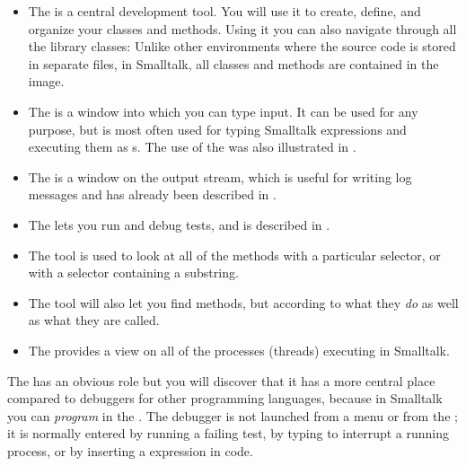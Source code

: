\documentclass[a4paper,10pt,twoside]{book}
\begin{document}
\begin{itemize}
	\item {The } is a central development tool.
		You will use it to create, define, and organize your classes and methods.
		Using it you can also navigate through all the library classes:
		Unlike other environments where the source code is stored in separate files, in Smalltalk, all classes and methods are contained in the image.

	\item{The } is a window into which you can type input.
		It can be used for any purpose, but is most often used for typing Smalltalk expressions and executing them as s.
		The use of the  was also illustrated in .

	\item{The } is a window on the  output stream, which is useful for writing log messages and has already been described in .

	\item{The } lets you run and debug \SUnit tests, and is described in .

	\item{The } tool is used to look at all of the methods with a particular selector, or with a selector containing a substring.

	\item{The } tool will also let you find methods, but according to what they \emph{do} as well as what they are called.

	\item{The  provides a view on all of the processes (threads) executing in Smalltalk.}
\end{itemize}

The  has an obvious role but you will discover that it has a more central place compared to debuggers for other programming languages, because in Smalltalk you can \emph{program} in the .
The debugger is not launched from a menu or from the \toolsflap; it is normally entered by running a failing test, by typing  to interrupt a running process, or by inserting a  expression in code.
\end{document}
